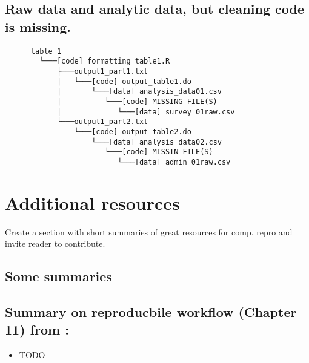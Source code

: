 \documentclass[]{book}
\providecommand{\tightlist}{%
  \setlength{\itemsep}{0pt}\setlength{\parskip}{0pt}}
\begin{document}
\hypertarget{raw-data-and-analytic-data-but-cleaning-code-is-missing.}{%
\subsection{Raw data and analytic data, but cleaning code is missing.}\label{raw-data-and-analytic-data-but-cleaning-code-is-missing.}}

\begin{verbatim}
      table 1
        └───[code] formatting_table1.R
            ├───output1_part1.txt  
            |   └───[code] output_table1.do           
            |       └───[data] analysis_data01.csv
            |          └───[code] MISSING FILE(S)
            |             └───[data] survey_01raw.csv
            └───output1_part2.txt  
                └───[code] output_table2.do           
                    └───[data] analysis_data02.csv
                       └───[code] MISSIN FILE(S)
                          └───[data] admin_01raw.csv  
\end{verbatim}

\hypertarget{additional-resources}{%
\section{Additional resources}\label{additional-resources}}

Create a section with short summaries of great resources for comp. repro and invite reader to contribute.

\hypertarget{some-summaries}{%
\subsection{Some summaries}\label{some-summaries}}

\hypertarget{summary-on-reproducbile-workflow-chapter-11-from-christensen2019transparent}{%
\subsection{\texorpdfstring{Summary on reproducbile workflow (Chapter 11) from \citet{christensen2019transparent}:}{Summary on reproducbile workflow (Chapter 11) from @christensen2019transparent:}}\label{summary-on-reproducbile-workflow-chapter-11-from-christensen2019transparent}}

\begin{itemize}
\tightlist
\item
  TODO
\end{itemize}
\end{document}
